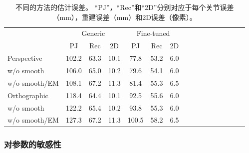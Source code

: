 \begin{table}
  \footnotesize
\caption{不同的方法的估计误差。 “PJ”，“Rec”和“2D”分别对应于每个关节误差（mm），重建误差（mm）和2D误差（像素）。}
\centering
\renewcommand{\arraystretch}{0.5}
\renewcommand{\tabcolsep}{0.1 mm}
\begin{tabular}{l*{15}{c}}
\toprule
& \multicolumn{3}{c}{Generic} & \multicolumn{3}{c}{Fine-tuned} \\
 & PJ & Rec  & 2D & PJ & Rec & 2D \\
\toprule
Perspective & 102.2 & 63.3 & 10.1 & 77.8 & 53.2 & 6.0 \\
w/o smooth & 106.0 & 65.0 & 10.2 & 79.6 & 54.1 & 6.0 \\
w/o smooth/EM & 108.1 & 67.2 & 11.3 & 81.4 & 55.3 & 6.5 \\
\hline
Orthographic & 118.4 & 64.4 & 10.1 & 92.5 & 55.6 & 6.0 \\
w/o smooth & 122.2 & 65.4 & 10.2 & 93.8 & 55.3 & 6.0 \\
w/o smooth/EM  \cite{zhou2015sparse} & 127.3 & 67.2 & 11.3 & 100.5 & 58.2 & 6.5 \\
\toprule
\end{tabular}
\label{tab:steps}
\end{table}

\subsubsection{对参数的敏感性}


